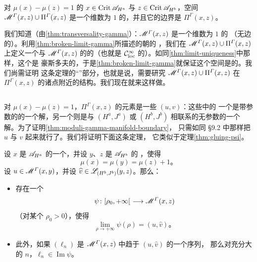 \begin{theorem}\label{thm:moduli-gamma-manifold-boundary}
对 $\mu(x)-\mu(z)=1$ 的 $x\in\operatorname{Crit}\mathscr{A}_{H^{a}}$ 与
$z\in\operatorname{Crit}\mathscr{A}_{H^{b}}$，空间 $\mathscr{M}^{\varGamma}(x,z)\cup\Pi^{\varGamma}(x,z)$
是一个维数为 $1$ 的\trCompact\trManifoldWithBoundary，并且它的边界是 $\Pi^{\varGamma}(x,z)$。
\end{theorem}

我们知道（由\cref{thm:transversality-gamma}）：$\mathscr{M}^{\varGamma}(x,z)$ 是一个维数为 $1$ 的
（无边的）\trManifold。利用\cref{thm:broken-limit-gamma}所描述的朝\trBrokenTrajectory{}的%
\trConvergence，我们在 $\mathscr{M}^{\varGamma}(x,z)\cup\Pi^{\varGamma}(x,z)$ 上定义一个与
$\mathscr{M}^{\varGamma}(x,z)$ 的\trTopology{}\trCompatible{}的\trTopology（也就是 $\mathcal{C}^{\infty}_{\mathrm{loc}}$
\trConvergence{}的\trTopology）。如同\cref{thm:limit-uniqueness}中那样，这个\trTopology{}是
豪斯多夫的，于是\cref{thm:broken-limit-gamma}就保证这个空间是\trCompact{}的。我们尚需证明
这条定理的“\trManifoldWithBoundary{}”部分，也就是说，需要研究 $\mathscr{M}^{\varGamma}(x,z)\cup\Pi^{\varGamma}(x,z)$
在 $\Pi^{\varGamma}(x,z)$ 的诸点附近的结构。我们现在就来这样做。

\subsection{\trGluing}
\label{subsec:gluing-gamma}

对 $\mu(x)-\mu(z)=1$，$\Pi^{\varGamma}(x,z)$ 的元素是一些\trBrokenTrajectory{} $(u,v)$：这些\trTrajectory{}中的
一个是带参数的\trFloerEquation{}的一个解，另一个则是与 $(H^{a},J^{a})$ 或 $(H^{b},J^{b})$
相联系的无参数\trFloerEquation{}的一个解。为了证明\cref{thm:moduli-gamma-manifold-boundary}，
只需如同 §9.2 中那样把\trTrajectory{} $u$ 与 $v$ \trGluing{}起来就行了。我们将证明下面这条定理，
它类似于\trGluing{}定理\cref{thm:gluing-psi}。

\begin{theorem}\label{thm:gluing-gamma}
设 $x$ 是 $\mathscr{A}_{H^{a}}$ 的一个\trCriticalPoint，并设 $y$、$z$ 是 $\mathscr{A}_{H^{b}}$ 的%
\trCriticalPoint，使得
\[
\mu(x)=\mu(y)=\mu(z)+1\text{。}
\]
设 $u\in\mathscr{M}^{\varGamma}(x,y)$，并设 $\widehat{v}\in\mathscr{L}_{(H^{b},J^{b})}(y,z)$。那么：
\begin{itemize}
\item 存在一个\trEmbedding
\[
\psi\colon[\rho_{0},+\infty[\ \longrightarrow\scr{M}^{\varGamma}(x,z)
\]
（对某个 $\rho_{0}>0$），使得
\[
\lim_{\rho\to+\infty}\psi(\rho)=(u,\widehat{v})\text{。}
\]
\item 此外，如果 $(\ell_{n})$ 是 $\mathscr{M}^{\varGamma}(x,z)$ 中趋于 $(u,\widehat{v})$ 的一个序列，
那么对充分大的 $n$，$\ell_{n}\in\operatorname{Im}\psi$。
\end{itemize}
\end{theorem}

